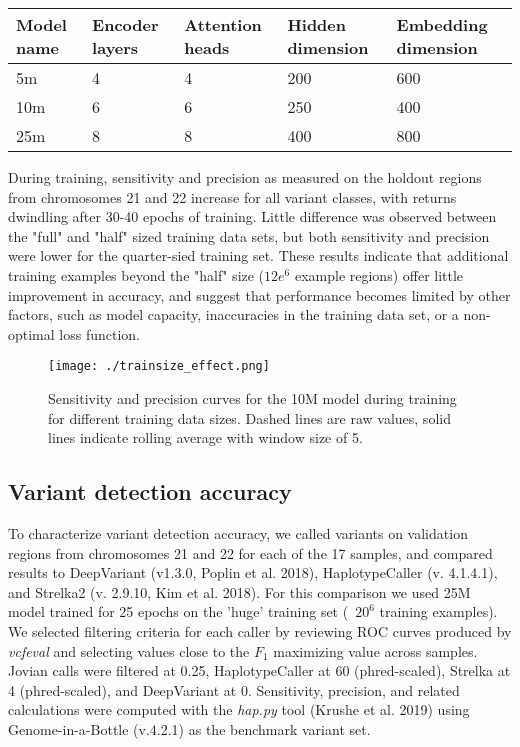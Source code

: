 \documentclass[]{article}
\begin{document}
\begin{center}
	\begin{tabular}{ lllll }
	 Model name & Encoder layers & Attention heads & Hidden dimension & Embedding dimension \\ 
	\hline
	 5m & 4 & 4 & 200 & 600 \\ 
	 10m & 6 & 6 & 250 & 400 \\ 
	 25m & 8 & 8 & 400 & 800 \\ 
	 \hline
	\end{tabular}
\end{center}

During training, sensitivity and precision as measured on the holdout regions from chromosomes 21 and 22 increase for all variant classes, with returns dwindling after 30-40 epochs of training. Little difference was observed between the "full" and "half" sized training data sets, but both sensitivity and precision were lower for the quarter-sied training set. These results indicate that additional training examples beyond the "half" size ($12e^6$ example regions) offer little improvement in accuracy, and suggest that performance becomes limited by other factors, such as model capacity, inaccuracies in the training data set, or a non-optimal loss function. 

\begin{figure}[htp]
	\texttt{[image: ./trainsize\_effect.png]}
	\caption{ Sensitivity and precision curves for the 10M model during training for different training data sizes. Dashed lines are raw values, solid lines indicate rolling average with window size of 5. }
	\label{fig:trainsize}
\end{figure}


\subsection{Variant detection accuracy}

To characterize variant detection accuracy, we called variants on validation regions from chromosomes 21 and 22 for each of the 17 samples, and compared results to DeepVariant (v1.3.0, Poplin et al. 2018), HaplotypeCaller (v. 4.1.4.1), and Strelka2 (v. 2.9.10, Kim et al. 2018). For this comparison we used 25M model trained for 25 epochs on the 'huge' training set (~$20^6$ training examples). We selected filtering criteria for each caller by reviewing ROC curves produced by \textit{vcfeval} and selecting values close to the $F_1$ maximizing value across samples. Jovian calls were filtered at 0.25, HaplotypeCaller at 60 (phred-scaled), Strelka at 4 (phred-scaled), and DeepVariant at 0. Sensitivity, precision, and related calculations were computed with the \textit{hap.py} tool (Krushe et al. 2019) using Genome-in-a-Bottle (v.4.2.1) as the benchmark variant set. 
\end{document}
